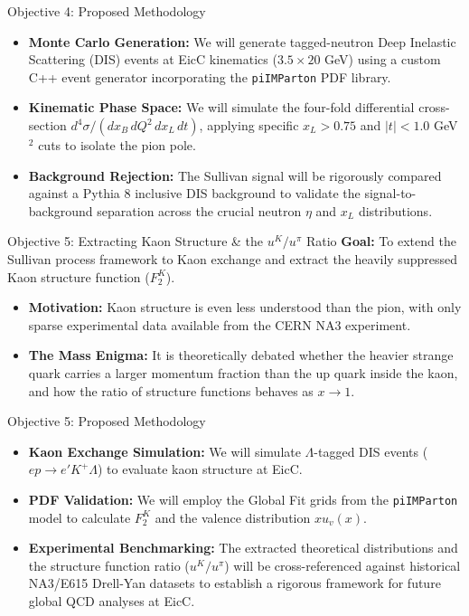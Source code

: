 \documentclass[aspectratio=169]{beamer}
\begin{document}
\begin{frame}{Objective 4: Proposed Methodology}
    \begin{itemize}
        \item \textbf{Monte Carlo Generation:} We will generate tagged-neutron Deep Inelastic Scattering (DIS) events at EicC kinematics ($3.5 \times 20$ GeV) using a custom C++ event generator incorporating the \texttt{piIMParton} PDF library.
        \item \textbf{Kinematic Phase Space:} We will simulate the four-fold differential cross-section $d^4\sigma/(dx_B\, dQ^2\, dx_L\, dt)$, applying specific $x_L > 0.75$ and $|t| < 1.0$ GeV$^2$ cuts to isolate the pion pole.
        \item \textbf{Background Rejection:} The Sullivan signal will be rigorously compared against a Pythia 8 inclusive DIS background to validate the signal-to-background separation across the crucial neutron $\eta$ and $x_L$ distributions.
    \end{itemize}
\end{frame}

\begin{frame}{Objective 5: Extracting Kaon Structure \& the $u^K/u^\pi$ Ratio}
    \textbf{Goal:} To extend the Sullivan process framework to Kaon exchange and extract the heavily suppressed Kaon structure function ($F_2^K$).
    \vspace{0.3cm}
    \begin{itemize}
        \item \textbf{Motivation:} Kaon structure is even less understood than the pion, with only sparse experimental data available from the CERN NA3 experiment. 
        \item \textbf{The Mass Enigma:} It is theoretically debated whether the heavier strange quark carries a larger momentum fraction than the up quark inside the kaon, and how the ratio of structure functions behaves as $x \rightarrow 1$.
    \end{itemize}
\end{frame}

\begin{frame}{Objective 5: Proposed Methodology}
    \begin{itemize}
        \item \textbf{Kaon Exchange Simulation:} We will simulate $\Lambda$-tagged DIS events ($ep \rightarrow e' K^+ \Lambda$) to evaluate kaon structure at EicC.
        \item \textbf{PDF Validation:} We will employ the Global Fit grids from the \texttt{piIMParton} model to calculate $F_2^K$ and the valence distribution $x u_v(x)$.
        \item \textbf{Experimental Benchmarking:} The extracted theoretical distributions and the structure function ratio ($u^K / u^\pi$) will be cross-referenced against historical NA3/E615 Drell-Yan datasets to establish a rigorous framework for future global QCD analyses at EicC.
    \end{itemize}
\end{frame}
\end{document}
